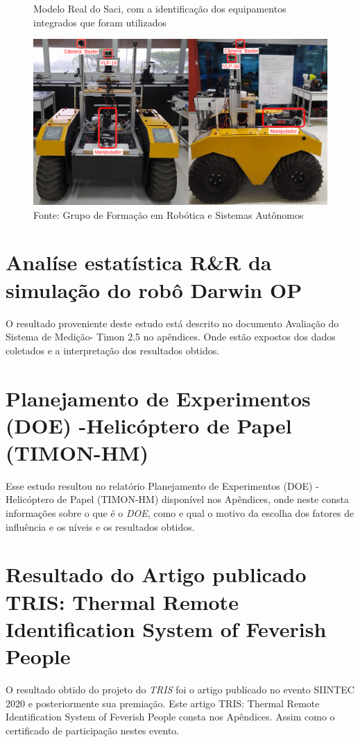 \begin{figure}[H]
    \caption{Modelo Real do Saci, com a identificação dos equipamentos integrados que foram utilizados}
    \centering
    \includegraphics[width= \textwidth]{Figures/warthog_compo2.png}
    \caption*{Fonte: Grupo de Formação em Robótica e Sistemas Autônomos}
    \label{fig:warthog_desafio_3}
\end{figure}


\section{Analíse estatística R\&R da simulação do robô Darwin OP }
\label{sec:analise_darwin}
O resultado proveniente deste estudo está descrito no documento Avaliação do Sistema de Medição- Timon 2.5 no apêndices. Onde estão expostos dos dados coletados e a interpretação dos resultados obtidos.


\section{Planejamento de Experimentos (DOE) -Helicóptero de Papel (TIMON-HM)}
\label{sec:analise_doe}
Esse estudo resultou no relatório Planejamento de Experimentos (DOE) -Helicóptero de Papel (TIMON-HM) disponível nos Apêndices, onde neste consta informações sobre o que é o \textit{DOE}, como e qual o motivo da escolha dos fatores de influência e os níveis e os resultados obtidos. 




\section{Resultado do Artigo publicado TRIS: Thermal Remote Identification System of Feverish People }
\label{sec:tris}
O resultado obtido do projeto do \textit{TRIS} foi o artigo publicado no evento SIINTEC 2020 e posteriormente sua premiação. Este artigo TRIS: Thermal Remote Identification System of Feverish People consta nos Apêndices. Assim como o certificado de participação nestes evento.
